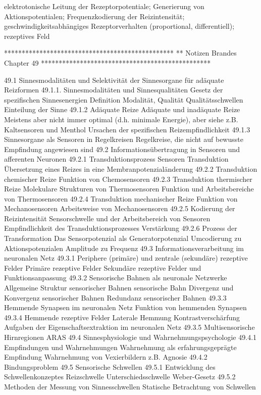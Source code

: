         elektrotonische Leitung der Rezeptorpotentiale; Generierung von Aktionspotentialen; Frequenzkodierung der Reizintensität; geschwindigkeitsabhängiges Rezeptorverhalten (proportional, differentiell); rezeptives Feld
        
        



************************************************
** Notizen Brandes Chapter 49
************************************************

49.1 Sinnesmodalitäten und Selektivität der Sinnesorgane für adäquate Reizformen
    49.1.1. Sinnesmodalitäten und Sinnesqualitäten
        Gesetz der spezifischen Sinnesenergien
            Definition Modalität, Qualität
        Qualitätsschwellen
        Einteilung der Sinne
    49.1.2 Adäquate Reize
        Adäquate und inadäquate Reize
            Meistens aber nicht immer optimal (d.h. minimale Energie), aber siehe z.B. Kaltsensoren und Menthol
        Ursachen der spezifischen Reizempfindlichkeit
   49.1.3 Sinnesorgane als Sensoren in Regelkreisen
        Regelkreise, die nicht auf bewusste Empfindung angewiesen sind
49.2 Informationsübertragung in Sensoren und afferenten Neuronen
    49.2.1 Transduktionsprozess
        Sensoren
        Transduktion
            Übersetzung eines Reizes in eine Membranpotenzialänderung
    49.2.2 Transduktion chemischer Reize
        Funktion von Chemosensoren
    49.2.3 Transduktion thermischer Reize
        Molekulare Strukturen von Thermosensoren
        Funktion und Arbeitsbereiche von Thermosensoren
    49.2.4 Transduktion mechanischer Reize
        Funktion von Mechanosensoren
        Arbeitsweise von Mechanosensoren
    49.2.5 Kodierung der Reizintensität
        Sensorschwelle und der Arbeitsbereich von Sensoren
        Empfindlichkeit des Transduktionsprozesses
            Verstärkung
    49.2.6 Prozess der Transformation
        Das Sensorpotenzial als Generatorpotenzial
        Umcodierung zu Aktionspotenzialen
            Amplitude zu Frequenz
49.3 Informationsverarbeitung im neuronalen Netz
    49.3.1 Periphere (primäre) und zentrale (sekundäre) rezeptive Felder
        Primäre rezeptive Felder
        Sekundäre rezeptive Felder und Funktionsanpassung
    49.3.2 Sensorische Bahnen als neuronale Netzwerke
        Allgemeine Struktur sensorischer Bahnen
            sensorische Bahn
        Divergenz und Konvergenz sensorischer Bahnen
        Redundanz sensorischer Bahnen
    49.3.3 Hemmende Synapsen im neuronalen Netz
        Funktion von hemmenden Synapsen
    49.3.4 Hemmende rezeptive Felder
        Laterale Hemmung
        Kontrastverschärfung
        Aufgaben der Eigenschaftsextraktion im neuronalen Netz
    49.3.5 Multisensorische Hirnregionen
            ARAS
49.4 Sinnesphysiologie und Wahrnehmungspsychologie
    49.4.1 Empfindungen und Wahrnehmungen
        Wahrnehmung als erfahrungsgeprägte Empfindung
        Wahrnehmung von Vexierbildern
            z.B. Agnosie
    49.4.2 Bindungsproblem
49.5 Sensorische Schwellen
    49.5.1 Entwicklung des Schwellenkonzeptes
        Reizschwelle
        Unterschiedsschwelle
            Weber-Gesetz
    49.5.2 Methoden der Messung von Sinnesschwellen
        Statische Betrachtung von Schwellen
        
